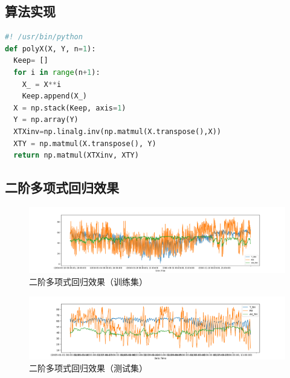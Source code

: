 \documentclass{ctexart}
\begin{document}
\subsection{算法实现}
\begin{file}[poly.py]
	\begin{lstlisting}[language=Python]
#! /usr/bin/python
def polyX(X, Y, n=1):
  Keep= []
  for i in range(n+1):
    X_ = X**i
    Keep.append(X_)
  X = np.stack(Keep, axis=1)
  Y = np.array(Y)
  XTXinv=np.linalg.inv(np.matmul(X.transpose(),X))
  XTY = np.matmul(X.transpose(), Y)
  return np.matmul(XTXinv, XTY)
	\end{lstlisting}
\end{file}
\subsection{二阶多项式回归效果}
\begin{figure}[H]
	\includegraphics[width=1.2\textwidth]{../images/poly1.png}
	\caption{二阶多项式回归效果（训练集）}
\end{figure}
\begin{figure}[H]
	\includegraphics[width=1.2\textwidth]{../images/poly2.png}
	\caption{二阶多项式回归效果（测试集）}
\end{figure}
\end{document}
